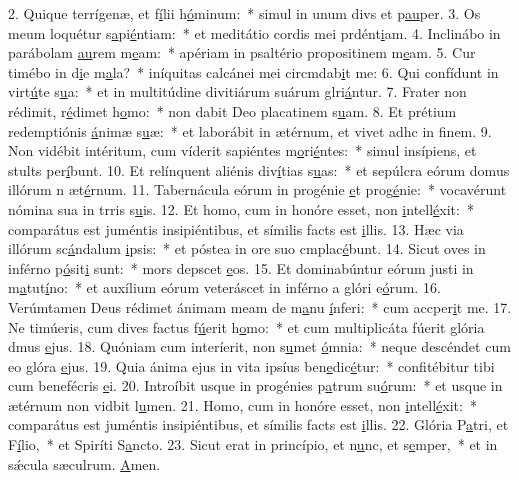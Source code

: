 2. Quique terrígenæ, et f\uline{í}lii h\uline{ó}minum:~* simul in unum divs et p\uline{au}per.
3. Os meum loquétur s\uline{a}pi\uline{é}ntiam:~* et meditátio cordis mei prdént\uline{i}am.
4. Inclinábo in parábolam \uline{au}rem m\uline{e}am:~* apériam in psaltério propositinem m\uline{e}am.
5. Cur timébo in d\uline{i}e m\uline{a}la?~* iníquitas calcánei mei circmdab\uline{i}t me:
6. Qui confídunt in virt\uline{ú}te s\uline{u}a:~* et in multitúdine divitiárum suárum glri\uline{á}ntur.
7. Frater non rédimit, r\uline{é}dimet h\uline{o}mo:~* non dabit Deo placatinem s\uline{u}am.
8. Et prétium redemptiónis \uline{á}nimæ s\uline{u}æ:~* et laborábit in ætérnum, et vivet adhc in f\uline{i}nem.
9. Non vidébit intéritum, cum víderit sapiéntes m\uline{o}ri\uline{é}ntes:~* simul insípiens, et stults per\uline{í}bunt.
10. Et relínquent aliénis div\uline{í}tias s\uline{u}as:~* et sepúlcra eórum domus illórum n æt\uline{é}rnum.
11. Tabernácula eórum in progénie \uline{e}t prog\uline{é}nie:~* vocavérunt nómina sua in trris s\uline{u}is.
12. Et homo, cum in honóre esset, non \uline{i}ntell\uline{é}xit:~* comparátus est juméntis insipiéntibus, et símilis facts est \uline{i}llis.
13. Hæc via illórum sc\uline{á}ndalum \uline{i}psis:~* et póstea in ore suo cmplac\uline{é}bunt.
14. Sicut oves in inférno p\uline{ó}sit\uline{i} sunt:~* mors depscet \uline{e}os.
15. Et dominabúntur eórum justi in m\uline{a}tut\uline{í}no:~* et auxílium eórum veteráscet in inférno a glóri e\uline{ó}rum.
16. Verúmtamen Deus rédimet ánimam meam de m\uline{a}nu \uline{í}nferi:~* cum accper\uline{i}t me.
17. Ne timúeris, cum dives factus f\uline{ú}erit h\uline{o}mo:~* et cum multiplicáta fúerit glória dmus \uline{e}jus.
18. Quóniam cum interíerit, non s\uline{u}met \uline{ó}mnia:~* neque descéndet cum eo glóra \uline{e}jus.
19. Quia ánima ejus in vita ipsíus ben\uline{e}dic\uline{é}tur:~* confitébitur tibi cum benefécris \uline{e}i.
20. Introíbit usque in progénies p\uline{a}trum su\uline{ó}rum:~* et usque in ætérnum non vidbit l\uline{u}men.
21. Homo, cum in honóre esset, non \uline{i}ntell\uline{é}xit:~* comparátus est juméntis insipiéntibus, et símilis facts est \uline{i}llis.
22. Glória P\uline{a}tri, et F\uline{í}lio,~* et Spiríti S\uline{a}ncto.
23. Sicut erat in princípio, et n\uline{u}nc, et s\uline{e}mper,~* et in sǽcula sæculrum. \uline{A}men.
